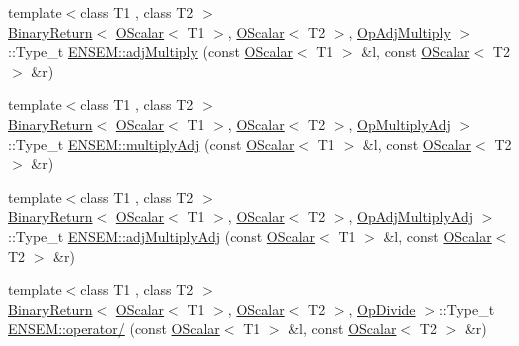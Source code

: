 \begin{DoxyCompactItemize}
\item 
{\footnotesize template$<$class T1 , class T2 $>$ }\\\mbox{\hyperlink{structENSEM_1_1BinaryReturn}{Binary\+Return}}$<$ \mbox{\hyperlink{classENSEM_1_1OScalar}{O\+Scalar}}$<$ T1 $>$, \mbox{\hyperlink{classENSEM_1_1OScalar}{O\+Scalar}}$<$ T2 $>$, \mbox{\hyperlink{structENSEM_1_1OpAdjMultiply}{Op\+Adj\+Multiply}} $>$\+::Type\+\_\+t \mbox{\hyperlink{group__obsscalar_ga98359922a5222cb069e48d5b6916390e}{E\+N\+S\+E\+M\+::adj\+Multiply}} (const \mbox{\hyperlink{classENSEM_1_1OScalar}{O\+Scalar}}$<$ T1 $>$ \&l, const \mbox{\hyperlink{classENSEM_1_1OScalar}{O\+Scalar}}$<$ T2 $>$ \&r)
\item 
{\footnotesize template$<$class T1 , class T2 $>$ }\\\mbox{\hyperlink{structENSEM_1_1BinaryReturn}{Binary\+Return}}$<$ \mbox{\hyperlink{classENSEM_1_1OScalar}{O\+Scalar}}$<$ T1 $>$, \mbox{\hyperlink{classENSEM_1_1OScalar}{O\+Scalar}}$<$ T2 $>$, \mbox{\hyperlink{structENSEM_1_1OpMultiplyAdj}{Op\+Multiply\+Adj}} $>$\+::Type\+\_\+t \mbox{\hyperlink{group__obsscalar_ga0549c309e400fa9b2c660bdec29e7f91}{E\+N\+S\+E\+M\+::multiply\+Adj}} (const \mbox{\hyperlink{classENSEM_1_1OScalar}{O\+Scalar}}$<$ T1 $>$ \&l, const \mbox{\hyperlink{classENSEM_1_1OScalar}{O\+Scalar}}$<$ T2 $>$ \&r)
\item 
{\footnotesize template$<$class T1 , class T2 $>$ }\\\mbox{\hyperlink{structENSEM_1_1BinaryReturn}{Binary\+Return}}$<$ \mbox{\hyperlink{classENSEM_1_1OScalar}{O\+Scalar}}$<$ T1 $>$, \mbox{\hyperlink{classENSEM_1_1OScalar}{O\+Scalar}}$<$ T2 $>$, \mbox{\hyperlink{structENSEM_1_1OpAdjMultiplyAdj}{Op\+Adj\+Multiply\+Adj}} $>$\+::Type\+\_\+t \mbox{\hyperlink{group__obsscalar_ga53406445c0fa210f9ed3a41ab077b31e}{E\+N\+S\+E\+M\+::adj\+Multiply\+Adj}} (const \mbox{\hyperlink{classENSEM_1_1OScalar}{O\+Scalar}}$<$ T1 $>$ \&l, const \mbox{\hyperlink{classENSEM_1_1OScalar}{O\+Scalar}}$<$ T2 $>$ \&r)
\item 
{\footnotesize template$<$class T1 , class T2 $>$ }\\\mbox{\hyperlink{structENSEM_1_1BinaryReturn}{Binary\+Return}}$<$ \mbox{\hyperlink{classENSEM_1_1OScalar}{O\+Scalar}}$<$ T1 $>$, \mbox{\hyperlink{classENSEM_1_1OScalar}{O\+Scalar}}$<$ T2 $>$, \mbox{\hyperlink{structENSEM_1_1OpDivide}{Op\+Divide}} $>$\+::Type\+\_\+t \mbox{\hyperlink{group__obsscalar_gadc02b34a3b7610b73a4ab6d413f19c17}{E\+N\+S\+E\+M\+::operator/}} (const \mbox{\hyperlink{classENSEM_1_1OScalar}{O\+Scalar}}$<$ T1 $>$ \&l, const \mbox{\hyperlink{classENSEM_1_1OScalar}{O\+Scalar}}$<$ T2 $>$ \&r)

\end{DoxyCompactItemize}
